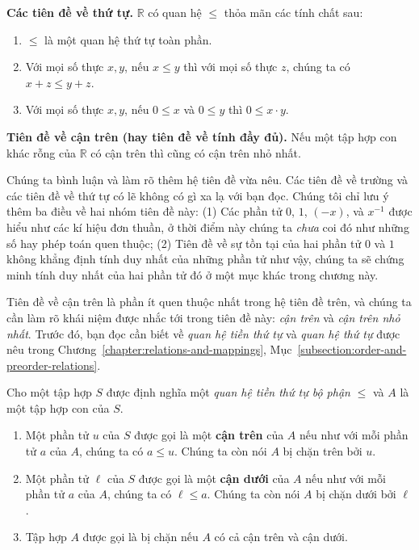 \begin{axiom}
    \textbf{Các tiên đề về thứ tự.} $\mathbb{R}$ có quan hệ $\leq$ thỏa mãn các tính chất sau:
    \begin{enumerate}[label={(\roman*)}]
        \item $\leq$ là một quan hệ thứ tự toàn phần.
        \item Với mọi số thực $x, y$, nếu $x\leq y$ thì với mọi số thực $z$, chúng ta có $x + z\leq y + z$.
        \item Với mọi số thực $x, y$, nếu $0\leq x$ và $0\leq y$ thì $0\leq x\cdot y$.
    \end{enumerate}

    \textbf{Tiên đề về cận trên (hay tiên đề về tính đầy đủ).} Nếu một tập hợp con khác rỗng của $\mathbb{R}$ có cận trên thì cũng có cận trên nhỏ nhất.
\end{axiom}

Chúng ta bình luận và làm rõ thêm hệ tiên đề vừa nêu. Các tiên đề về trường và các tiên đề về thứ tự có lẽ không có gì xa lạ với bạn đọc. Chúng tôi chỉ lưu ý thêm ba điều về hai nhóm tiên đề này: (1) Các phần tử $0$, $1$, $(-x)$, và $x^{-1}$ được hiểu như các kí hiệu đơn thuần, ở thời điểm này chúng ta \textit{chưa} coi đó như những số hay phép toán quen thuộc; (2) Tiên đề về sự tồn tại của hai phần tử $0$ và $1$ không khẳng định tính duy nhất của những phần tử như vậy, chúng ta sẽ chứng minh tính duy nhất của hai phần tử đó ở một mục khác trong chương này.

Tiên đề về cận trên là phần ít quen thuộc nhất trong hệ tiên đề trên, và chúng ta cần làm rõ khái niệm được nhắc tới trong tiên đề này: \textit{cận trên} và \textit{cận trên nhỏ nhất}. Trước đó, bạn đọc cần biết về \textit{quan hệ tiền thứ tự} và \textit{quan hệ thứ tự} được nêu trong Chương~\ref{chapter:relations-and-mappings}, Mục~\ref{subsection:order-and-preorder-relations}.

\begin{definition}
    Cho một tập hợp $S$ được định nghĩa một \textit{quan hệ tiền thứ tự bộ phận} $\leq$ và $A$ là một tập hợp con của $S$.
    \begin{enumerate}[label={(\roman*)}]
        \item Một phần tử $u$ của $S$ được gọi là một \textbf{cận trên} của $A$ nếu như với mỗi phần tử $a$ của $A$, chúng ta có $a\leq u$. Chúng ta còn nói $A$ bị chặn trên bởi $u$.
        \item Một phần tử $\ell$ của $S$ được gọi là một \textbf{cận dưới} của $A$ nếu như với mỗi phần tử $a$ của $A$, chúng ta có $\ell\leq a$. Chúng ta còn nói $A$ bị chặn dưới bởi $\ell$.
        \item Tập hợp $A$ được gọi là bị chặn nếu $A$ có cả cận trên và cận dưới.
    \end{enumerate}
\end{definition}

